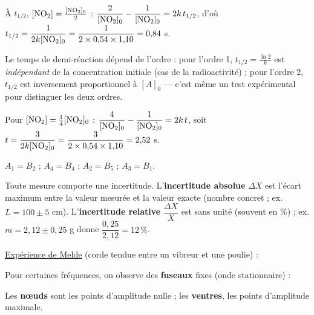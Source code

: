 \documentclass[11pt]{article}
\begin{document}
 À $t_{1/2}$, $[\mathrm{NO_2}] = \frac{[\mathrm{NO_2}]_0}{2}$ : $\dfrac{2}{[\mathrm{NO_2}]_0} - \dfrac{1}{[\mathrm{NO_2}]_0} = 2k\,t_{1/2}$, d'où $t_{1/2} = \dfrac{1}{2k[\mathrm{NO_2}]_0} = \dfrac{1}{2\times 0{,}54\times 1{,}10} = 0{,}84$ s.

\begin{rappel}
Le temps de demi-réaction dépend de l'ordre : pour l'ordre 1,
$t_{1/2} = \frac{\ln 2}{k}$ est \emph{indépendant} de la concentration
initiale (cas de la radioactivité) ; pour l'ordre 2, $t_{1/2}$ est
inversement proportionnel à $[A]_0$ — c'est même un test expérimental
pour distinguer les deux ordres.
\end{rappel}

 Pour $[\mathrm{NO_2}] = \frac{1}{4}[\mathrm{NO_2}]_0$ : $\dfrac{4}{[\mathrm{NO_2}]_0} - \dfrac{1}{[\mathrm{NO_2}]_0} = 2k\,t$, soit $t = \dfrac{3}{2k[\mathrm{NO_2}]_0} = \dfrac{3}{2\times 0{,}54\times 1{,}10} = 2{,}52$ s.


$A_1 = B_2$ ; \quad $A_4 = B_4$ ; \quad $A_2 = B_5$ ; \quad $A_3 = B_1$.

Toute mesure comporte une incertitude. L'\textbf{incertitude absolue} $\Delta X$ est l'écart maximum entre la valeur mesurée et la valeur exacte (nombre concret ; ex. $L = 100 \pm 5$ cm). L'\textbf{incertitude relative} $\dfrac{\Delta X}{X}$ est sans unité (souvent en \%) ; ex. $m = 2{,}12 \pm 0{,}25$ g donne $\dfrac{0{,}25}{2{,}12} = 12\,\%$.

\underline{Expérience de Melde} (corde tendue entre un vibreur et une poulie) :
\begin{center}
\end{center}
Pour certaines fréquences, on observe des \textbf{fuseaux} fixes (onde stationnaire) :
\begin{center}
\end{center}
Les \textbf{nœuds} sont les points d'amplitude nulle ; les \textbf{ventres}, les points d'amplitude maximale.
\end{document}
